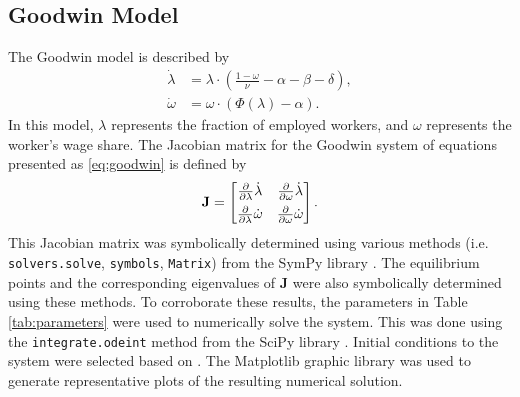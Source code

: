 \documentclass[12pt, centerh1]{article}
\begin{document}
\subsection{Goodwin Model}
The Goodwin model is described by
\begin{equation}\label{eq:goodwin} 
\begin{split}
    \dot{\lambda} &= \lambda \cdot \left( \frac{1-\omega}{\nu} - \alpha - \beta - \delta \right), \\
    \dot{\omega} &= \omega \cdot (\Phi(\lambda) - \alpha).
\end{split}
\end{equation}
In this model, $\lambda$ represents the fraction of employed workers, and $\omega$ represents the worker's wage share. The Jacobian matrix for the Goodwin system of equations presented as \eqref{eq:goodwin} is defined by
\begin{equation} \label{eq:goodwinJ}
\mathbf J =
\begin{bmatrix}
    \pdv{\lambda}\dot{\lambda} & \pdv{\omega}\dot{\lambda}\\[1ex]
    \pdv{\lambda}\dot{\omega} & \pdv{\omega}\dot{\omega}
\end{bmatrix}.
\end{equation}
This Jacobian matrix was symbolically determined using various methods (i.e. \texttt{solvers.solve}, \texttt{symbols}, \texttt{Matrix}) from the SymPy library \citep{SymPy}.  The equilibrium points and the corresponding eigenvalues of $\mathbf J$ were also symbolically determined using these methods. To corroborate these results, the parameters in Table \ref{tab:parameters} were used to numerically solve the system. This was done using the \texttt{integrate.odeint} method from the SciPy library \citep{2020SciPy-NMeth}. Initial conditions to the system were selected based on \citet{grasselli2012analysis}. The Matplotlib \citep{matplotlib} graphic library was used to generate representative plots of the resulting numerical solution.
\end{document}

